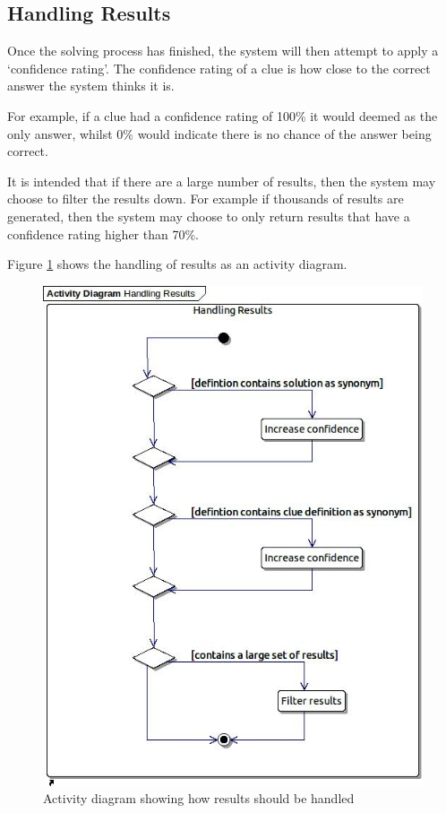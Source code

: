 \subsection{Handling Results} 
\label{sub:results}

Once the solving process has finished, the system will then attempt to apply a 
`confidence rating'. The confidence rating of a clue is how close to the correct
answer the system thinks it is. 

For example, if a clue had a confidence rating of 100\% it would deemed as the 
only answer, whilst 0\% would indicate there is no chance of the answer being 
correct.

It is intended that if there are a large number of results, then the system may
choose to filter the results down. For example if thousands of results are 
generated, then the system may choose to only return results that have a 
confidence rating higher than 70\%.

Figure \ref{fig:results_activity} shows the handling of results as an activity 
diagram.

\begin{figure}[H]
  \centering
  \includegraphics[scale=0.6]{activity/handling_results.jpg}
  \caption{Activity diagram showing how results should be handled}
  \label{fig:results_activity}
\end{figure}
